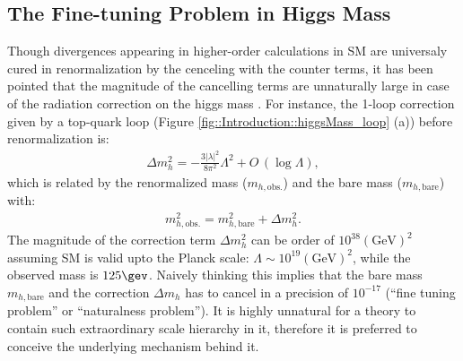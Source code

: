 \subsection{The Fine-tuning Problem in Higgs Mass} \label{sec::Introduction::homeworkSM::fineTuning}
Though divergences appearing in higher-order calculations in SM are universaly cured in renormalization by the cenceling with the counter terms, 
it has been pointed that the magnitude of the cancelling terms are unnaturally large in case of the radiation correction on the higgs mass 
\cite{HMassHeiararchyWeinberg1,HMassHeiararchyWeinberg2,HMassHeiararchyGildener,HMassHeiararchySusskind}. 
For instance, the 1-loop correction given by a top-quark loop (Figure \ref{fig::Introduction::higgsMass_loop} (a)) before renormalization is:
\begin{align}
\Delta m_h ^2 = - \frac{3|\lambda|^2}{8\pi^2} \Lambda^2 + O\,(\log\Lambda),
\label{eq::naturalness1}
\end{align}
%
which is related by the renormalized mass ($m_{h,\mathrm{obs.}}$) and the bare mass ($m_{h,\mathrm{bare}}$) with:
\begin{align}
m^2_{h,\mathrm{obs.}} = m^2_{h,\mathrm{bare}} + \Delta m_h ^2.
\label{eq::naturalnessBare}
\end{align}
The magnitude of the correction term $\Delta m_h ^2$ can be order of $10^{38}(\mathrm{GeV})^2$ assuming SM is valid upto the Planck scale: $\Lambda \sim 10^{19} (\mathrm{GeV})^2$, while the observed mass is $125\gev$.
Naively thinking this implies that the bare mass $m_{h,\mathrm{bare}}$ and the correction $\Delta m_h$ has to cancel in a precision of $10^{-17}$ (``fine tuning problem'' or ``naturalness problem''). It is highly unnatural for a theory to contain such extraordinary scale hierarchy in it, therefore it is preferred to conceive the underlying mechanism behind it.  \\

